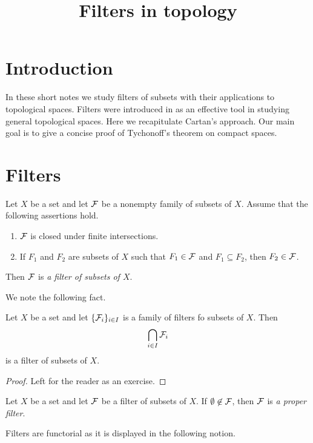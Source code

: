



\title{Filters in topology}
\date{}
\maketitle

\section{Introduction}
\noindent
In these short notes we study filters of subsets with their applications to topological spaces. Filters were introduced in \cite{cartan1937filters} as an effective tool in studying general topological spaces. Here we recapitulate Cartan's approach. Our main goal is to give a concise proof of Tychonoff's theorem on compact spaces.

\section{Filters}

\begin{definition}
Let $X$ be a set and let ${\mathcal F}$ be a nonempty family of subsets of $X$. Assume that the following assertions hold.
\begin{enumerate}[label=\textbf{(\arabic*)}, leftmargin=*]
\item ${\mathcal F}$ is closed under finite intersections.
\item If $F_1$ and $F_2$ are subsets of $X$ such that $F_1 \in {\mathcal F}$ and $F_1\subseteq F_2$, then $F_2 \in {\mathcal F}$.
\end{enumerate}
Then ${\mathcal F}$ is \textit{a filter of subsets of $X$}.
\end{definition}
\noindent
We note the following fact. 

\begin{fact}\label{fact:filters_are_closed_under_intersections}
Let $X$ be a set and let $\{{\mathcal F}_i\}_{i\in I}$ is a family of filters fo subsets of $X$. Then 
$$\bigcap_{i\in I}{\mathcal F}_i$$
is a filter of subsets of $X$.
\end{fact}
\begin{proof}
Left for the reader as an exercise.
\end{proof}

\begin{definition}
Let $X$ be a set and let ${\mathcal F}$ be a filter of subsets of $X$. If $\emptyset \not \in {\mathcal F}$, then ${\mathcal F}$ is \textit{a proper filter}.
\end{definition}
\noindent
Filters are functorial as it is displayed in the following notion. 

